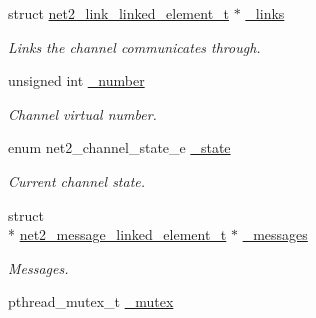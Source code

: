 \begin{DoxyCompactItemize}
\item 
\hypertarget{structnet2__channel__input__t_a361553649d82ea4d450721ba7578cf5c}{struct \hyperlink{structnet2__link__linked__element__t}{net2\-\_\-link\-\_\-linked\-\_\-element\-\_\-t} $\ast$ \hyperlink{structnet2__channel__input__t_a361553649d82ea4d450721ba7578cf5c}{\-\_\-links}}\label{structnet2__channel__input__t_a361553649d82ea4d450721ba7578cf5c}

\begin{DoxyCompactList}\small\item\em Links the channel communicates through. \end{DoxyCompactList}\item 
\hypertarget{structnet2__channel__input__t_aad432fed1cbfe759ef2d473ab8f47109}{unsigned int \hyperlink{structnet2__channel__input__t_aad432fed1cbfe759ef2d473ab8f47109}{\-\_\-number}}\label{structnet2__channel__input__t_aad432fed1cbfe759ef2d473ab8f47109}

\begin{DoxyCompactList}\small\item\em Channel virtual number. \end{DoxyCompactList}\item 
\hypertarget{structnet2__channel__input__t_a3363f7063e071be71e1320617a870b84}{enum net2\-\_\-channel\-\_\-state\-\_\-e \hyperlink{structnet2__channel__input__t_a3363f7063e071be71e1320617a870b84}{\-\_\-state}}\label{structnet2__channel__input__t_a3363f7063e071be71e1320617a870b84}

\begin{DoxyCompactList}\small\item\em Current channel state. \end{DoxyCompactList}\item 
\hypertarget{structnet2__channel__input__t_a62adebf1311e1002e0f5a67fa00ea1a0}{struct \\*
\hyperlink{structnet2__message__linked__element__t}{net2\-\_\-message\-\_\-linked\-\_\-element\-\_\-t} $\ast$ \hyperlink{structnet2__channel__input__t_a62adebf1311e1002e0f5a67fa00ea1a0}{\-\_\-messages}}\label{structnet2__channel__input__t_a62adebf1311e1002e0f5a67fa00ea1a0}

\begin{DoxyCompactList}\small\item\em Messages. \end{DoxyCompactList}\item 
\hypertarget{structnet2__channel__input__t_a9d656c00ee2f6d89286272487bac4ec3}{pthread\-\_\-mutex\-\_\-t \hyperlink{structnet2__channel__input__t_a9d656c00ee2f6d89286272487bac4ec3}{\-\_\-mutex}}\label{structnet2__channel__input__t_a9d656c00ee2f6d89286272487bac4ec3}


\end{DoxyCompactItemize}
